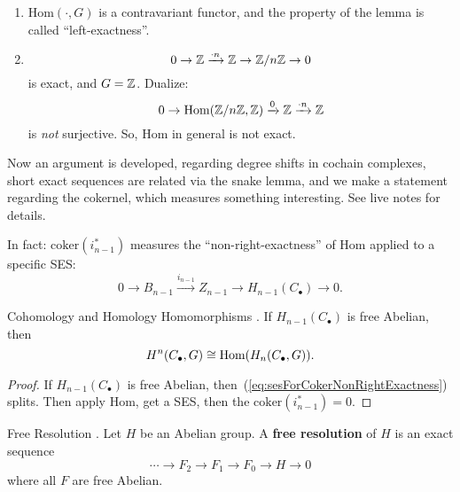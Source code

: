 \documentclass{article}
\begin{document}
\begin{enumerate}
\item $\text{Hom}(\cdot, G)$ is a contravariant functor, and the property of the lemma is called ``left-exactness''.
\item
  \begin{equation}
    0 \rightarrow \mathbb{Z} \xrightarrow{\cdot n} \mathbb{Z} \rightarrow \mathbb{Z} / n \mathbb{Z} \rightarrow 0
  \end{equation}
  is exact, and $G = \mathbb{Z}$. Dualize:
  \begin{equation}
    0 \rightarrow \text{Hom}(\mathbb{Z}/n\mathbb{Z}, \mathbb{Z}) \xrightarrow{0} \mathbb{Z} \xrightarrow{\cdot n} \mathbb{Z}
  \end{equation}
  is \textit{not} surjective. So, Hom in general is not exact.
\end{enumerate}

Now an argument is developed, regarding degree shifts in cochain complexes, short exact sequences are related via the snake lemma, and we make a statement regarding the cokernel, which measures something interesting. See live notes for details.

In fact: $\text{coker} (i_{n-1}^{*})$ measures the ``non-right-exactness'' of Hom applied to a specific SES:
\begin{equation}\label{eq:sesForCokerNonRightExactness}
  0 \rightarrow B_{n-1} \xrightarrow{i_{n-1}} Z_{n - 1} \rightarrow H_{n - 1}(C_{\bullet}) \rightarrow 0.
\end{equation}

\begin{Corollary}{Cohomology and Homology Homomorphisms}
.  If $H_{n-1}(C_{\bullet})$ is free Abelian, then
\begin{equation}
  H^n(C_{\bullet}, G) \cong \text{\normalfont Hom} (H_{n}(C_{\bullet}, G)).
\end{equation}
\end{Corollary}

\begin{proof}
  If $H_{n-1}(C_{\bullet})$ is free Abelian, then~(\ref{eq:sesForCokerNonRightExactness}) splits. Then apply Hom, get a SES, then the $\text{coker}(i_{n-1}^{*}) = 0$.
\end{proof}

\begin{Definition}{Free Resolution}
.  Let $H$ be an Abelian group. A \textbf{free resolution} of $H$ is an exact sequence
\begin{equation}
  \cdots \rightarrow F_2 \rightarrow F_1 \rightarrow F_0 \rightarrow H \rightarrow 0
\end{equation}
where all $F$ are free Abelian.
\end{Definition}
\end{document}
